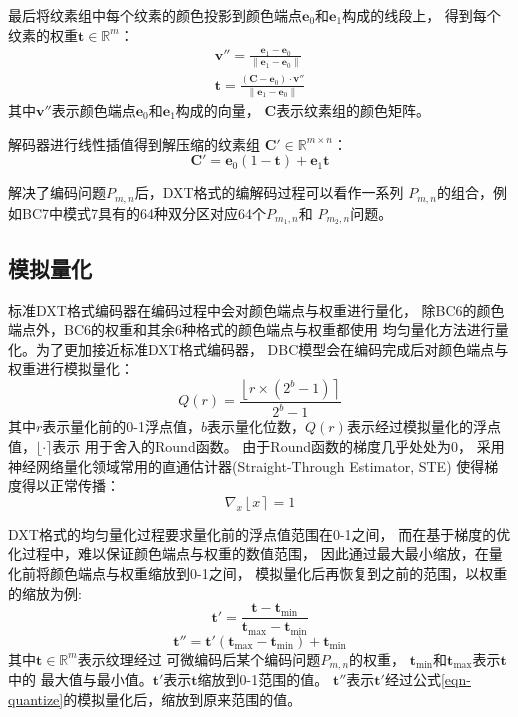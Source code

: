 最后将纹素组中每个纹素的颜色投影到颜色端点$\mathbf{e}_0$和$\mathbf{e}_1$构成的线段上，
得到每个纹素的权重$\mathbf{t}\in\mathbb{R}^m$：
\begin{align}
    \mathbf{v''}=\frac{\mathbf{e}_1-\mathbf{e}_0}{\|\mathbf{e}_1-\mathbf{e}_0\|}\\
    \mathbf{t}=\frac{(\mathbf{C}-\mathbf{e}_0)\cdot\mathbf{v''}}{\|\mathbf{e}_1-\mathbf{e}_0\|}
\end{align}
其中$\mathbf{v''}$表示颜色端点$\mathbf{e}_0$和$\mathbf{e}_1$构成的向量，
$\mathbf{C}$表示纹素组的颜色矩阵。

解码器进行线性插值得到解压缩的纹素组 $\mathbf{C}'\in\mathbb{R}^{m\times n}$：
\begin{equation}
\mathbf{C}'=\mathbf{e}_0(1-\mathbf{t})+\mathbf{e}_1\mathbf{t}
\end{equation}

解决了编码问题$P_{m,n}$后，DXT格式的编解码过程可以看作一系列
$P_{m,n}$的组合，例如BC7中模式7具有的64种双分区对应64个$P_{m_1,n}$和
$P_{m_2,n}$问题。

\subsection{模拟量化}
\label{模拟量化}

标准DXT格式编码器在编码过程中会对颜色端点与权重进行量化，
除BC6的颜色端点外，BC6的权重和其余6种格式的颜色端点与权重都使用
均匀量化方法进行量化。为了更加接近标准DXT格式编码器，
DBC模型会在编码完成后对颜色端点与权重进行模拟量化：
\begin{equation}\label{eqn-quantize}
    Q(r)=\frac{\left \lfloor r \times (2^{b}-1) \right \rceil}{2^{b}-1}
\end{equation}
其中$r$表示量化前的0-1浮点值，$b$表示量化位数，$Q(r)$表示经过模拟量化的浮点值，$\lfloor \cdot \rceil$表示
用于舍入的Round函数。
由于Round函数的梯度几乎处处为0，
采用神经网络量化领域常用的直通估计器\cite{bengio2013estimating}(Straight-Through Estimator, STE)
使得梯度得以正常传播：
\begin{equation}\label{eqn-7}
    \nabla_{x} \left \lfloor x \right \rceil=1
\end{equation}

DXT格式的均匀量化过程要求量化前的浮点值范围在0-1之间，
而在基于梯度的优化过程中，难以保证颜色端点与权重的数值范围，
因此通过最大最小缩放，在量化前将颜色端点与权重缩放到0-1之间，
模拟量化后再恢复到之前的范围，以权重的缩放为例:
\begin{equation}
    \mathbf{t'}=\frac{\mathbf{t}-\mathbf{t}_\text{min}}{\mathbf{t}_\text{max}-\mathbf{t}_\text{min}}
\end{equation}
\begin{equation}
    \mathbf{t''}=\mathbf{t'}(\mathbf{t}_\text{max}-\mathbf{t}_\text{min})+\mathbf{t}_\text{min}
\end{equation}
其中$\mathbf{t}\in\mathbb{R}^m$表示纹理经过
可微编码后某个编码问题$P_{m,n}$的权重，
$\mathbf{t}_\text{min}$和$\mathbf{t}_\text{max}$表示$\mathbf{t}$中的
最大值与最小值。$\mathbf{t'}$表示$\mathbf{t}$缩放到0-1范围的值。
$\mathbf{t''}$表示$\mathbf{t'}$经过公式\ref{eqn-quantize}的模拟量化后，缩放到原来范围的值。


